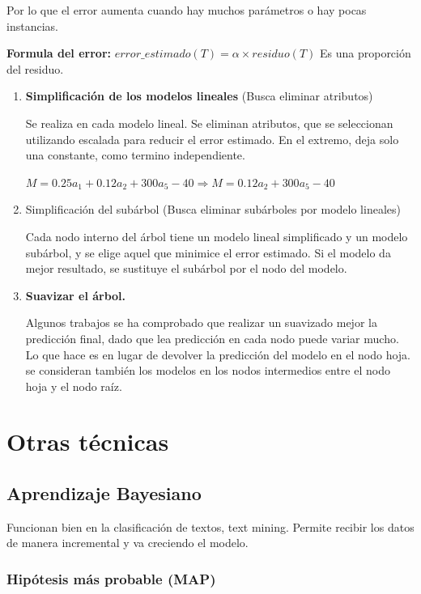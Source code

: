 \documentclass[12pt]{report} %
\begin{document}
Por lo que el error aumenta cuando hay muchos parámetros o hay pocas
instancias.

\textbf{Formula del error:}
\(error\_estimado(T) = \alpha \times residuo(T)\) Es una proporción del
residuo.

\begin{enumerate}
\def\labelenumi{\arabic{enumi}.}
\item
  \textbf{Simplificación de los modelos lineales} (Busca eliminar
  atributos)

  Se realiza en cada modelo lineal. Se eliminan atributos, que se
  seleccionan utilizando escalada para reducir el error estimado. En el
  extremo, deja solo una constante, como termino independiente.

  \(M= 0.25a_1+0.12a_2+300a_5-40 \Rightarrow M=0.12a_2+300a_5-40\)
\item
  Simplificación del subárbol (Busca eliminar subárboles por modelo
  lineales)

  Cada nodo interno del árbol tiene un modelo lineal simplificado y un
  modelo subárbol, y se elige aquel que minimice el error estimado. Si
  el modelo da mejor resultado, se sustituye el subárbol por el nodo del
  modelo.
\item
  \textbf{Suavizar el árbol.}

  Algunos trabajos se ha comprobado que realizar un suavizado mejor la
  predicción final, dado que lea predicción en cada nodo puede variar
  mucho. Lo que hace es en lugar de devolver la predicción del modelo en
  el nodo hoja. se consideran también los modelos en los nodos
  intermedios entre el nodo hoja y el nodo raíz.
\end{enumerate}

\chapter{Otras técnicas}

\section{Aprendizaje Bayesiano}

Funcionan bien en la clasificación de textos, text mining. Permite
recibir los datos de manera incremental y va creciendo el modelo.

\subsection{Hipótesis más probable
(MAP)}
\end{document}
